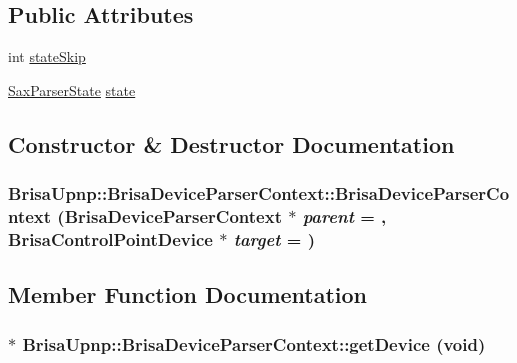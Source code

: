\subsection*{Public Attributes}
\begin{DoxyCompactItemize}
\item 
int \hyperlink{classBrisaUpnp_1_1BrisaDeviceParserContext_a77686c7b733596cc8c525460a60ec462}{stateSkip}
\item 
\hyperlink{namespaceBrisaUpnp_a73e019fb9c2f13e86a645f4b2812eca0}{SaxParserState} \hyperlink{classBrisaUpnp_1_1BrisaDeviceParserContext_a0f7e35905740896c06ceaba7c7a0681d}{state}
\end{DoxyCompactItemize}


\subsection{Constructor \& Destructor Documentation}
\hypertarget{classBrisaUpnp_1_1BrisaDeviceParserContext_a791954f904323f932d133841b748b3f3}{
\subsubsection[{BrisaDeviceParserContext}]{\setlength{\rightskip}{0pt plus 5cm}BrisaUpnp::BrisaDeviceParserContext::BrisaDeviceParserContext ({\bf BrisaDeviceParserContext} $\ast$ {\em parent} = {}, \/  {\bf BrisaControlPointDevice} $\ast$ {\em target} = {})}}
\label{classBrisaUpnp_1_1BrisaDeviceParserContext_a791954f904323f932d133841b748b3f3}


\subsection{Member Function Documentation}
\hypertarget{classBrisaUpnp_1_1BrisaDeviceParserContext_a359313a9b2a0ba47f6a08883a45b69e8}{
\subsubsection[{getDevice}]{$\ast$ BrisaUpnp::BrisaDeviceParserContext::getDevice (void)}}
\label{classBrisaUpnp_1_1BrisaDeviceParserContext_a359313a9b2a0ba47f6a08883a45b69e8}


